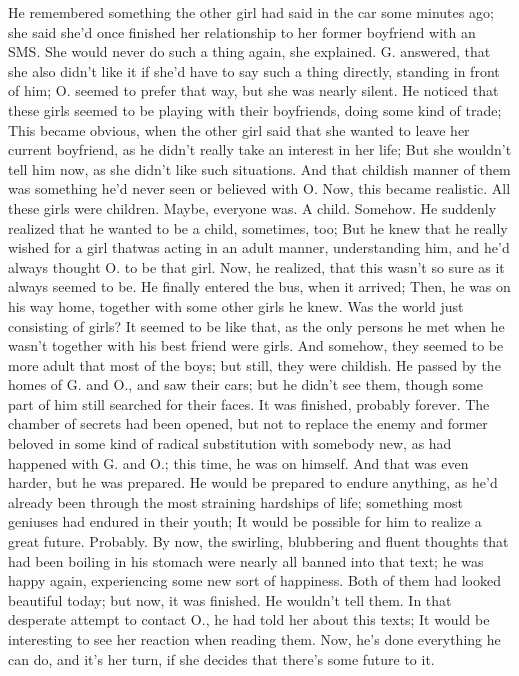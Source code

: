 He remembered something the other girl had said in the car some minutes ago; she said she'd once finished her relationship to her former boyfriend with an SMS. 
She would never do such a thing again, she explained. 
G. answered, that she also didn't like it if she'd have to say such a thing directly, standing in front of him; O. seemed to prefer that way, but she was nearly silent. 
He noticed that these girls seemed to be playing with their boyfriends, doing some kind of trade; This became obvious, when the other girl said that she wanted to leave her current boyfriend, as he didn't really take an interest in her life; But she wouldn't tell him now, as she didn't like such situations. 
And that childish manner of them was something he'd never seen or believed with O. 
Now, this became realistic. 
All these girls were children. 
Maybe, everyone was. 
A child. 
Somehow. 
He suddenly realized that he wanted to be a child, sometimes, too; But he knew that he really wished for a girl thatwas acting in an adult manner, understanding him, and he'd always thought O. to be that girl. 
Now, he realized, that this wasn't so sure as it always seemed to be. 
He finally entered the bus, when it arrived; Then, he was on his way home, together with some other girls he knew. Was the world just consisting of girls?
It seemed to be like that, as the only persons he met when he wasn't together with his best friend were girls. 
And somehow, they seemed to be more adult that most of the boys; but still, they were childish. 
He passed by the homes of G. and O., and saw their cars; but he didn't see them, though some part of him still searched for their faces. 
It was finished, probably forever. 
The chamber of secrets had been opened, but not to replace the enemy and former beloved in some kind of radical substitution with somebody new, as had happened with G. and O.; this time, he was on himself. 
And that was even harder, but he was prepared. 
He would be prepared to endure anything, as he'd already been through the most straining hardships of life; something most geniuses had endured in their youth; It would be possible for him to realize a great future. 
Probably. 
By now, the swirling, blubbering and fluent thoughts that had been boiling in his stomach were nearly all banned into that text; he was happy again, experiencing some new sort of happiness. 
Both of them had looked beautiful today; but now, it was finished. He wouldn't tell them. In that desperate attempt to contact O., he had told her about this texts; It would be interesting to see her reaction when reading them. Now, he's done everything he can do, and it's her turn, if she decides that there's some future to it. 

